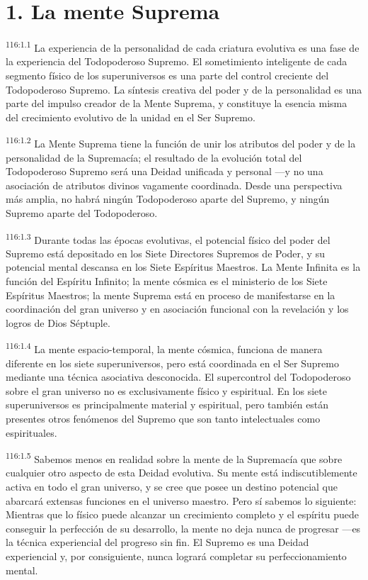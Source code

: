 \documentclass[twoside, 11pt]{book}
\begin{document}
\section*{1. La mente Suprema}
\par
\textsuperscript{116:1.1} La experiencia de la personalidad de cada criatura evolutiva es una fase de la experiencia del Todopoderoso Supremo. El sometimiento inteligente de cada segmento físico de los superuniversos es una parte del control creciente del Todopoderoso Supremo. La síntesis creativa del poder y de la personalidad es una parte del impulso creador de la Mente Suprema, y constituye la esencia misma del crecimiento evolutivo de la unidad en el Ser Supremo.

\par
\textsuperscript{116:1.2} La Mente Suprema tiene la función de unir los atributos del poder y de la personalidad de la Supremacía; el resultado de la evolución total del Todopoderoso Supremo será una Deidad unificada y personal ---y no una asociación de atributos divinos vagamente coordinada. Desde una perspectiva más amplia, no habrá ningún Todopoderoso aparte del Supremo, y ningún Supremo aparte del Todopoderoso.

\par
\textsuperscript{116:1.3} Durante todas las épocas evolutivas, el potencial físico del poder del Supremo está depositado en los Siete Directores Supremos de Poder, y su potencial mental descansa en los Siete Espíritus Maestros. La Mente Infinita es la función del Espíritu Infinito; la mente cósmica es el ministerio de los Siete Espíritus Maestros; la mente Suprema está en proceso de manifestarse en la coordinación del gran universo y en asociación funcional con la revelación y los logros de Dios Séptuple.

\par
\textsuperscript{116:1.4} La mente espacio-temporal, la mente cósmica, funciona de manera diferente en los siete superuniversos, pero está coordinada en el Ser Supremo mediante una técnica asociativa desconocida. El supercontrol del Todopoderoso sobre el gran universo no es exclusivamente físico y espiritual. En los siete superuniversos es principalmente material y espiritual, pero también están presentes otros fenómenos del Supremo que son tanto intelectuales como espirituales.

\par
\textsuperscript{116:1.5} Sabemos menos en realidad sobre la mente de la Supremacía que sobre cualquier otro aspecto de esta Deidad evolutiva. Su mente está indiscutiblemente activa en todo el gran universo, y se cree que posee un destino potencial que abarcará extensas funciones en el universo maestro. Pero sí sabemos lo siguiente: Mientras que lo físico puede alcanzar un crecimiento completo y el espíritu puede conseguir la perfección de su desarrollo, la mente no deja nunca de progresar ---es la técnica experiencial del progreso sin fin. El Supremo es una Deidad experiencial y, por consiguiente, nunca logrará completar su perfeccionamiento mental.
\end{document}
